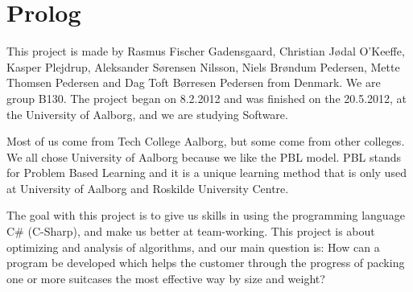 \chapter{Prolog}

This project is made by Rasmus Fischer Gadensgaard, Christian Jødal O’Keeffe, Kasper Plejdrup, Aleksander Sørensen Nilsson, Niels Brøndum Pedersen, Mette Thomsen Pedersen and Dag Toft Børresen Pedersen from Denmark. We are group B130. The project began on 8.2.2012 and was finished on the 20.5.2012, at the University of Aalborg, and we are studying Software.

Most of us come from Tech College Aalborg, but some come from other colleges. We all chose University of Aalborg because we like the PBL model. PBL stands for Problem Based Learning and it is a unique learning method that is only used at University of Aalborg and Roskilde University Centre.

The goal with this project is to give us skills in using the programming language C# (C-Sharp), and make us better at team-working. This project is about optimizing and analysis of algorithms, and our main question is: How can a program be developed which helps the customer through the progress of packing one or more suitcases the most effective way by size and weight?
